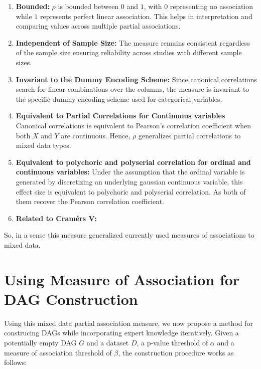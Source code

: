 \documentclass{uai2025} %
\begin{document}
\begin{enumerate}
	\item \textbf{Bounded: } $ \rho $ is bounded between $ 0 $ and $ 1 $,
		with $ 0 $ representing no association while $ 1 $ represents
		perfect linear association. This helps in interpretation and
		comparing values across multiple partial associations.
	\item \textbf{Independent of Sample Size: } The measure remains consistent
		regardless of the sample size ensuring reliability across 
		studies with different sample sizes.
	\item \textbf{Invariant to the Dummy Encoding Scheme: } Since canonical
		correlations search for linear combinations over the columns,
		the measure is invariant to the specific dummy encoding
		scheme used for categorical variables.
	\item \textbf{Equivalent to Partial Correlations for Continuous variables}
		Canonical correlations is equivalent to Pearson's correlation coefficient
		when both $ X $ and $ Y $ are continuous. Hence, $ \rho $ generalizes
		partial correlations to mixed data types.
	\item \textbf{Equivalent to polychoric and polyserial correlation for ordinal and continuous variables: }
		Under the assumption that the ordinal variable is generated by
		discretizing an underlying gaussian continuous variable, this
		effect size is equivalent to polychoric and polyserial
		correlation. As both of them recover the Pearson correlation
		coefficient.
	\item \textbf{Related to Cram\'ers V: } 
\end{enumerate}

So, in a sense this measure generalized currently used measures of associations
to mixed data.

\section{Using Measure of Association for DAG Construction}
\label{sec:modification}

Using this mixed data partial association measure, we now propose a method for
construcing DAGs while incorporating expert knowledge iteratively. Given a
potentially empty DAG $ G $ and a dataset $ D $, a p-value threshold of $
\alpha $ and a measure of association threshold of $ \beta $, the construction
procedure works as follows:
\end{document}
